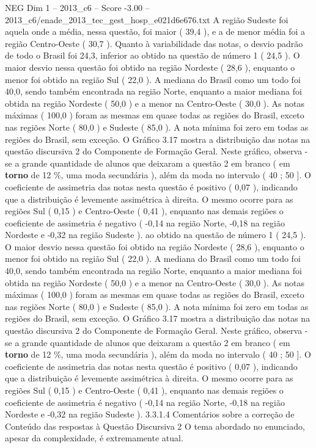 \begin{textsample}{NEG Dim 1 – 2013\_c6 – Score -3.00 – 2013\_c6/enade\_2013\_tec\_gest\_hosp\_e021d6e676.txt}
A região Sudeste foi aquela onde a média, nessa questão, foi maior ( 39,4 ), e a de menor média foi a região Centro-Oeste ( 30,7 ).
Quanto à variabilidade das notas, o desvio padrão de todo o Brasil foi 24,3, inferior ao obtido na questão de número 1 ( 24,5 ).
O maior desvio nessa questão foi obtido na região Nordeste ( 28,6 ), enquanto o menor foi obtido na região Sul ( 22,0 ).
A mediana do Brasil como um todo foi 40,0, sendo também encontrada na região Norte, enquanto a maior mediana foi obtida na região Nordeste ( 50,0 ) e a menor na Centro-Oeste ( 30,0 ).
As notas máximas ( 100,0 ) foram as mesmas em quase todas as regiões do Brasil, exceto nas regiões Norte ( 80,0 ) e Sudeste ( 85,0 ).
A nota mínima foi zero em todas as regiões do Brasil, sem exceção.
O Gráfico 3.17 mostra a distribuição das notas na questão discursiva 2 do Componente de Formação Geral.
Neste gráfico, observa -se a grande quantidade de alunos que deixaram a questão 2 em branco ( em \textbf{torno} de 12 \%, uma moda secundária ), além da moda no intervalo ( 40 ; 50 ].
O coeficiente de assimetria das notas nesta questão é positivo ( 0,07 ), indicando que a distribuição é levemente assimétrica à direita.
O mesmo ocorre para as regiões Sul ( 0,15 ) e Centro-Oeste ( 0,41 ), enquanto nas demais regiões o coeficiente de assimetria é negativo ( -0,14 na região Norte, -0,18 na região Nordeste e -0,32 na região Sudeste ). ao obtido na questão de número 1 ( 24,5 ).
O maior desvio nessa questão foi obtido na região Nordeste ( 28,6 ), enquanto o menor foi obtido na região Sul ( 22,0 ).
A mediana do Brasil como um todo foi 40,0, sendo também encontrada na região Norte, enquanto a maior mediana foi obtida na região Nordeste ( 50,0 ) e a menor na Centro-Oeste ( 30,0 ).
As notas máximas ( 100,0 ) foram as mesmas em quase todas as regiões do Brasil, exceto nas regiões Norte ( 80,0 ) e Sudeste ( 85,0 ).
A nota mínima foi zero em todas as regiões do Brasil, sem exceção.
O Gráfico 3.17 mostra a distribuição das notas na questão discursiva 2 do Componente de Formação Geral.
Neste gráfico, observa -se a grande quantidade de alunos que deixaram a questão 2 em branco ( em \textbf{torno} de 12 \%, uma moda secundária ), além da moda no intervalo ( 40 ; 50 ].
O coeficiente de assimetria das notas nesta questão é positivo ( 0,07 ), indicando que a distribuição é levemente assimétrica à direita.
O mesmo ocorre para as regiões Sul ( 0,15 ) e Centro-Oeste ( 0,41 ), enquanto nas demais regiões o coeficiente de assimetria é negativo ( -0,14 na região Norte, -0,18 na região Nordeste e -0,32 na região Sudeste ). 3.3.1.4 Comentários sobre a correção de Conteúdo das respostas à Questão Discursiva 2 O tema abordado no enunciado, apesar da complexidade, é extremamente atual.

\end{textsample}
